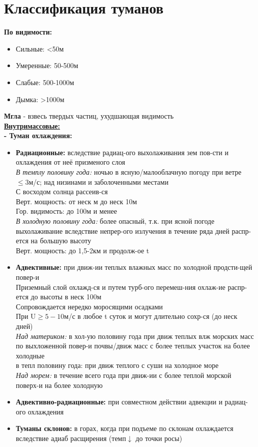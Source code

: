 
\section{Классификация туманов}
\textbf{По видимости:}
\begin{itemize}
	\item Сильные: <50м
	\item Умеренные: 50-500м
	\item Слабые: 500-1000м
	\item Дымка: >1000м
\end{itemize}
\textbf{Мгла} - взвесь твердых частиц, ухудшающая видимость\\
\underline{\textbf{Внутримассовые:}}\\
\textbf{- Туман охлаждения:}
\begin{itemize}
	\item \textbf{Радиационные:} вследствие радиац-ого выхолаживания зем пов-сти и охлаждения от неё призменого слоя\\
	
	\textit{В темплу половину года:} ночью в ясную/малооблачную погоду при ветре $\leqslant 3$м/с; над низинами и заболоченными местами\\
	С восходом солнца рассеив-ся\\
	Верт. мощность: от неск м до неск 10м\\
	Гор. видимость: до 100м и менее\\
	
	\textit{В холодную половину года:} более опасный, т.к. при ясной погоде выхолаживание вследствие непрер-ого излучения в течение ряда дней распр-ется на большую высоту\\
	Верт. мощность: до 1,5-2км и продолж-ое t
	\item \textbf{Адвективные:} при движ-ии теплых влажных масс по холодной продсти-щей повер-и\\
	Приземный слой охлажд-ся и путем турб-ого перемеш-ния охлаж-ие распр-ется до высоты в неск 100м\\
	Сопровождается нередко моросящими осадками\\
	При U$\geqslant5-10$м/с в любое t суток и могут длительно сохр-ся (до неск дней)\\
	
	\textit{Над материком:} в хол-ую половину года при движ теплых влж морских масс по выхложенной повер-и почвы/движ масс с более теплых участок на более холодные\\
	в тепл половину года: при движ теплого с суши на холодное море\\
	
	\textit{Над морем:} в течение всего года при движ-ии с более теплой морской поверх-и на более холодную
	\item \textbf{Адвективно-радиационные:} при совместном действии адвекции и радиац-ого охлаждения
	\item \textbf{Туманы склонов:} в горах, когда при подъеме по склонам охлаждается вследствие адиаб расщирения (темп$\downarrow$ до точки росы)
\end{itemize}
